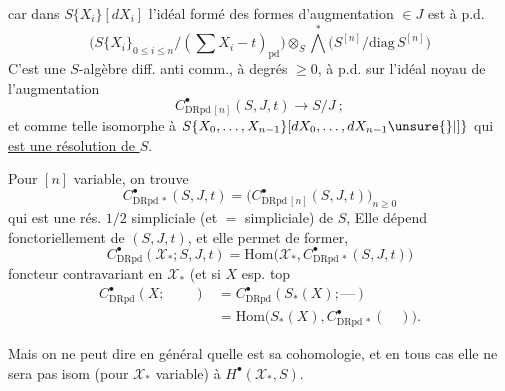 car dans $S\{X_i\}[dX_i]$ l'idéal formé des formes  d'augmentation $\in J$ est à p.d.
\[
\big(S\{X_i\}_{0\leq i\leq n}/(\textstyle\sum X_i-t)_{\mathrm{pd}}\big)
\otimes_S\bigwedge^{\ast}\big(S^{[n]}/\mathrm{diag}\,S^{[n]}\big)
\]
C'est une $S$-algèbre diff.  anti comm., à degrés $\geq 0$,  à p.d. sur l'idéal  noyau de l'augmentation
\[
C^{\bullet}_{\mathrm{DRpd}\,[n]}(S,J,t)\longrightarrow S/J\ ;
\]
et comme telle isomorphe à $S\{X_0,\ldots,X_{n-1}\}[dX_0,\ldots,dX_{n-1}\unsure{\}|\mathclose{]}}$ qui \uline{est une résolution de $S$}. 

Pour $[n]$ variable, on trouve
\[
C^{\bullet}_{\mathrm{DRpd}\,\ast}(S,J,t)=
\big(C^{\bullet}_{\mathrm{DRpd}\,[n]}(S,J,t)\big)_{n\geq 0}
\]
qui est une rés. $1/2$ simpliciale (et $=$ simpliciale) de $S$,  Elle dépend fonctoriellement de $(S,J,t)$, et elle permet de former, 
\[
C^{\bullet}_{\mathrm{DRpd}}(\mathscr X_{\ast};S,J,t)=\mathrm{Hom}\big(\mathscr X_{\ast},C^{\bullet}_{\mathrm{DRpd}\,\ast}(S,J,t)\big)
\]
foncteur contravariant en $\mathscr X_{\ast}$\unsure{!} (et si $X$ esp. top
\[
\begin{aligned}
C^{\bullet}_{\mathrm{DRpd}}(X;\qquad)&=C^{\bullet}_{\mathrm{DRpd}}(S_{\ast}(X);\text{---})\\
&=\mathrm{Hom}\big(S_{\ast}(X),C^{\bullet}_{\mathrm{DRpd}\,\ast}(\quad)\big).
\end{aligned}
\]

Mais on ne peut dire en général  quelle est sa cohomologie, et en tous cas elle ne sera pas isom (pour $\mathscr X_{\ast}$ variable) à $H^\bullet(\mathscr X_{\ast},S)$.


